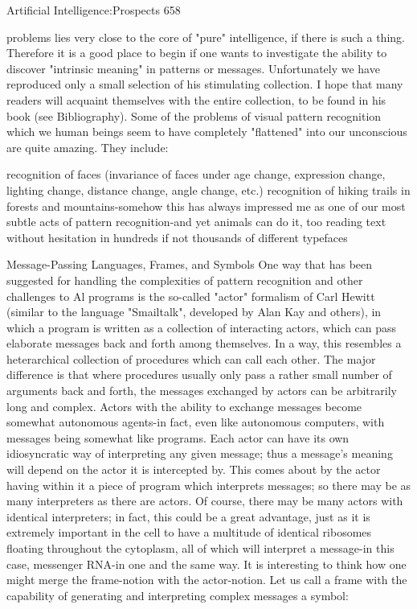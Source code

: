 Artificial Intelligence:Prospects                                                          658

problems lies very close to the core of "pure" intelligence, if there is such a thing.
Therefore it is a good place to begin if one wants to investigate the ability to discover
"intrinsic meaning" in patterns or messages. Unfortunately we have reproduced only a
small selection of his stimulating collection. I hope that many readers will acquaint
themselves with the entire collection, to be found in his book (see Bibliography).
        Some of the problems of visual pattern recognition which we human beings seem
to have completely "flattened" into our unconscious are quite amazing. They include:

   recognition of faces (invariance of faces under age change, expression change,
      lighting change, distance change, angle change, etc.)
   recognition of hiking trails in forests and mountains-somehow this has always
      impressed me as one of our most subtle acts of pattern recognition-and yet
      animals can do it, too
   reading text without hesitation in hundreds if not thousands of different typefaces

             Message-Passing Languages, Frames, and Symbols
One way that has been suggested for handling the complexities of pattern recognition and
other challenges to Al programs is the so-called "actor" formalism of Carl Hewitt (similar
to the language "Smailtalk", developed by Alan Kay and others), in which a program is
written as a collection of interacting actors, which can pass elaborate messages back and
forth among themselves. In a way, this resembles a heterarchical collection of procedures
which can call each other. The major difference is that where procedures usually only
pass a rather small number of arguments back and forth, the messages exchanged by
actors can be arbitrarily long and complex.
         Actors with the ability to exchange messages become somewhat autonomous
agents-in fact, even like autonomous computers, with messages being somewhat like
programs. Each actor can have its own idiosyncratic way of interpreting any given
message; thus a message's meaning will depend on the actor it is intercepted by. This
comes about by the actor having within it a piece of program which interprets messages;
so there may be as many interpreters as there are actors. Of course, there may be many
actors with identical interpreters; in fact, this could be a great advantage, just as it is
extremely important in the cell to have a multitude of identical ribosomes floating
throughout the cytoplasm, all of which will interpret a message-in this case, messenger
RNA-in one and the same way.
It is interesting to think how one might merge the frame-notion with the actor-notion. Let
us call a frame with the capability of generating and interpreting complex messages a
symbol:

